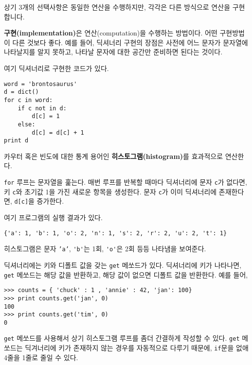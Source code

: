 상기 3개의 선택사항은 동일한 연산을 수행하지만, 각각은 다른 방식으로 연산을 구현합니다.


{\bf 구현(implementation)}은 연산(computation)을 수행하는 방법이다. 어떤 구현방법이 다른 것보다 좋다.
예를 들어, 딕셔너리 구현의 장점은 사전에 어느 문자가 문자열에 나타날지를 알지 못하고, 나타날 문자에 대한 공간만 준비하면 된다는 것이다.

여기 딕셔너리로 구현한 코드가 있다.

\beforeverb
\begin{verbatim}
word = 'brontosaurus'
d = dict()
for c in word:
    if c not in d:
        d[c] = 1
    else:
        d[c] = d[c] + 1
print d
\end{verbatim}
\afterverb
%

카우터 혹은 빈도에 대한 통계 용어인 {\bf 히스토그램(histogram)}를 효과적으로 연산한다.


{\tt for} 루프는 문자열을 훑는다. 매번 루프를 반복할 때마다 딕셔너리에 문자 {\tt c}가 없다면, 키 {\tt c}와 초기값 1을 가진 새로운 항목을 생성한다.
문자 {\tt c}가 이미 딕셔너리에 존재한다면, {\tt d[c]}을 증가한다.


여기 프로그램의 실행 결과가 있다.

\beforeverb
\begin{verbatim}
{'a': 1, 'b': 1, 'o': 2, 'n': 1, 's': 2, 'r': 2, 'u': 2, 't': 1}
\end{verbatim}
\afterverb
%

히스토그램은 문자 {\tt 'a'}, \verb"'b'"는 1회, \verb"'o'"은 2회 등등 나타냄을 보여준다.


딕셔너리에는 키와 디폴트 값을 갖는 {\tt get} 메쏘드가 있다. 
딕셔너리에 키가 나타나면, {\tt get} 메쏘드는 해당 값을 반환하고, 해당 값이 없으면 디폴트 값을 반환한다. 예를 들어,

\beforeverb
\begin{verbatim}
>>> counts = { 'chuck' : 1 , 'annie' : 42, 'jan': 100}
>>> print counts.get('jan', 0)
100
>>> print counts.get('tim', 0)
0
\end{verbatim}
\afterverb
%

{\tt get} 메쏘드를 사용해서 상기 히스토그램 루프를 좀더 간결하게 작성할 수 있다.
{\tt get} 메쏘드는 딕겨너리에 키가 존재하지 않는 경우를 자동적으로 다루기 때문에, {\tt if}문을 없애 4줄을 1줄로 줄일 수 있다.

